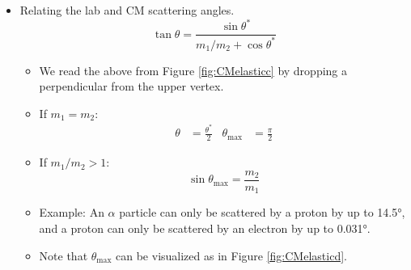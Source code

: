\documentclass[../notes.tex]{subfiles}
\begin{document}
\begin{itemize}
\begin{itemize}
\begin{itemize}
        \end{itemize}
        \item Relating the lab and CM scattering angles.
        \begin{equation*}
            \tan\theta = \frac{\sin\theta^*}{m_1/m_2+\cos\theta^*}
        \end{equation*}
        \begin{itemize}
            \item We read the above from Figure \ref{fig:CMelasticc} by dropping a perpendicular from the upper vertex.
            \item If $m_1=m_2$:
            \begin{align*}
                \theta &= \frac{\theta^*}{2}&
                \theta_\text{max} &= \frac{\pi}{2}
            \end{align*}
            \item If $m_1/m_2>1$:
            \begin{equation*}
                \sin\theta_\text{max} = \frac{m_2}{m_1}
            \end{equation*}
            \item Example: An $\alpha$ particle can only be scattered by a proton by up to \ang{14.5}, and a proton can only be scattered by an electron by up to \ang{0.031}.
            \item Note that $\theta_\text{max}$ can be visualized as in Figure \ref{fig:CMelasticd}.
        \end{itemize}
    \end{itemize}
\end{itemize}
\end{document}
